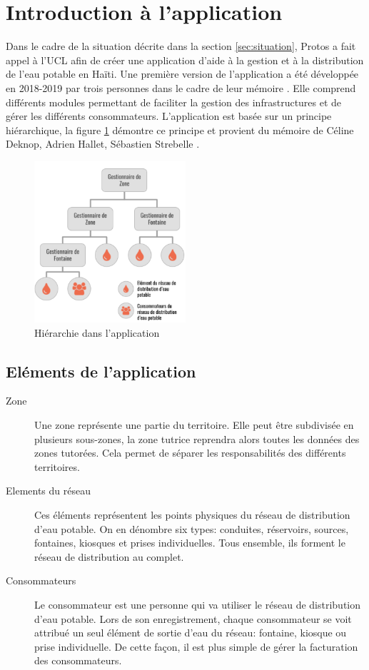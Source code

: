 \documentclass{EPL-master-thesis-covers-FR}
\begin{document}
		\section{Introduction à l'application}
				Dans le cadre de la situation décrite dans la section \ref{sec:situation}, Protos a fait appel à l'UCL afin de créer une application d'aide à la gestion et à la distribution de l'eau potable en Haïti. Une première version de l'application a été développée en 2018-2019 par trois personnes dans le cadre de leur mémoire \cite{ref:haitiwater}. Elle comprend différents modules permettant de faciliter la gestion des infrastructures et de gérer les différents consommateurs. L'application est basée sur un principe hiérarchique, la figure \ref{fig:hierarchie} démontre ce principe et provient du mémoire de Céline Deknop, Adrien Hallet, Sébastien Strebelle \cite{ref:haitiwater}.
				
				\begin{figure}[H]
					\centering
					\includegraphics[width=0.5\textwidth]{images/hierarchie}
					\caption{Hiérarchie dans l'application}
					\label{fig:hierarchie}
				\end{figure}
				
				
			\subsection*{Eléments de l'application}
				\begin{description}
					\item[Zone] Une zone représente une partie du territoire. Elle peut être subdivisée en plusieurs sous-zones, la zone tutrice reprendra alors toutes les données des zones tutorées. Cela permet de séparer les responsabilités des différents territoires.
					\item[Elements du réseau] Ces éléments représentent les points physiques du réseau de distribution d'eau potable. On en dénombre six types: conduites, réservoirs, sources, fontaines, kiosques et prises individuelles. Tous ensemble, ils forment le réseau de distribution au complet. 
					\item[Consommateurs] Le consommateur est une personne qui va utiliser le réseau de distribution d'eau potable. Lors de son enregistrement, chaque consommateur se voit attribué un seul élément de sortie d'eau du réseau: fontaine, kiosque ou prise individuelle. De cette façon, il est plus simple de gérer la facturation des consommateurs.
				\end{description}
				
\end{document}
